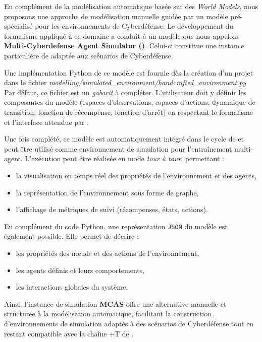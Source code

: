 En complément de la modélisation automatique basée sur des \textit{World Models}, nous proposons une approche de modélisation manuelle guidée par un modèle pré-spécialisé pour les environnements de Cyberdéfense.
Le développement du formalisme  appliqué à ce domaine a conduit à un modèle que nous appelons \textbf{Multi-Cyberdefense Agent Simulator ()}. Celui-ci constitue une instance particulière de  adaptée aux scénarios de Cyberdéfense.

Une implémentation Python de ce modèle est fournie dès la création d'un projet dans le fichier
\textit{modelling/simulated\_environment/handcrafted\_environment.py}
Par défaut, ce fichier est un \textit{gabarit} à compléter. L'utilisateur doit y définir les composantes du modèle (espaces d'observations, espaces d'actions, dynamique de transition, fonction de récompense, fonction d'arrêt) en respectant le formalisme  et l'interface attendue par .


Une fois complété, ce modèle est automatiquement intégré dans le cycle de  et peut être utilisé comme environnement de simulation pour l'entraînement multi-agent. L'exécution peut être réalisée en mode \textit{tour à tour}, permettant :
\begin{itemize}
  \item la visualisation en temps réel des propriétés de l'environnement et des agents,
  \item la représentation de l'environnement sous forme de graphe,
  \item l'affichage de métriques de suivi (récompenses, états, actions).
\end{itemize}
En complément du code Python, une représentation \texttt{JSON} du modèle est également possible. Elle permet de décrire :
\begin{itemize}
  \item les propriétés des nœuds et des actions de l'environnement,
  \item les agents définis et leurs comportements,
  \item les interactions globales du système.
\end{itemize}

\medskip
Ainsi, l'instance de simulation \textbf{MCAS} offre une alternative manuelle et structurée à la modélisation automatique, facilitant la construction d'environnements de simulation adaptés à des scénarios de Cyberdéfense tout en restant compatible avec la chaîne +T de .


